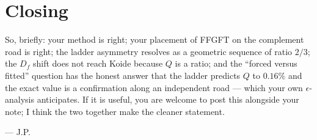 \section{Closing}

So, briefly: your method is right; your placement of FFGFT on the
complement road is right; the ladder asymmetry resolves as a geometric
sequence of ratio $2/3$; the $D_f$ shift does not reach Koide because $Q$
is a ratio; and the ``forced versus fitted'' question has the honest answer
that the ladder predicts $Q$ to $0.16\%$ and the exact value is a
confirmation along an independent road --- which your own $\epsilon$-analysis
anticipates. If it is useful, you are welcome to post this alongside your
note; I think the two together make the cleaner statement.

\begin{flushright}\small
--- J.P.
\end{flushright}
